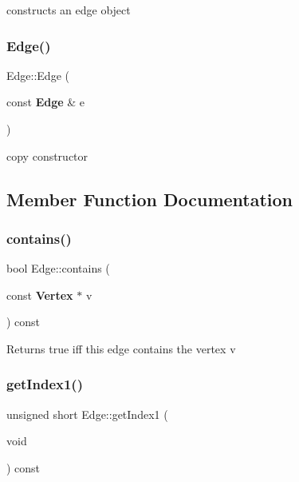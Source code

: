 constructs an edge object \mbox{\label{classEdge_a70ed9f4d5f93c9cc5273a34361781532}} 
\subsubsection{Edge()\hspace{0.1cm}{\footnotesize\ttfamily [3/3]}}
{\footnotesize\ttfamily Edge\+::\+Edge (\begin{DoxyParamCaption}\item[{const \textbf{ Edge} \&}]{e }\end{DoxyParamCaption})}

copy constructor 

\subsection{Member Function Documentation}
\mbox{\label{classEdge_a382681c66e048bb4bdfbd226db6958de}} 
\subsubsection{contains()}
{\footnotesize\ttfamily bool Edge\+::contains (\begin{DoxyParamCaption}\item[{const \textbf{ Vertex} $\ast$}]{v }\end{DoxyParamCaption}) const}

\begin{DoxyReturn}{Returns}
true iff this edge contains the vertex v 
\end{DoxyReturn}
\mbox{\label{classEdge_a10939171ecd22a7839f6986dae97279f}} 
\subsubsection{get\+Index1()}
{\footnotesize\ttfamily unsigned short Edge\+::get\+Index1 (\begin{DoxyParamCaption}\item[{void}]{ }\end{DoxyParamCaption}) const\hspace{0.3cm}{\ttfamily [inline]}}

\mbox{\label{classEdge_a2c9cbfe1125d3ca19e36bceed5612dbe}} 
